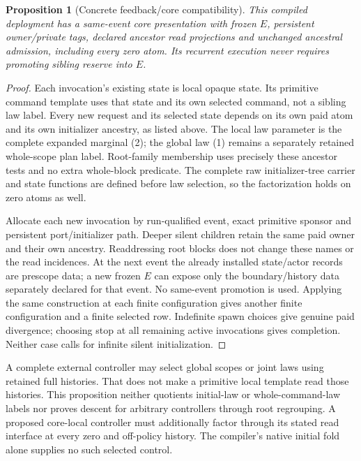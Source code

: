\documentclass[11pt]{article}
\newtheorem{proposition}{Proposition}
\begin{document}
\begin{proposition}[Concrete feedback/core compatibility]
This compiled deployment has a same-event core presentation with frozen $E$, persistent owner/private tags, declared ancestor read projections and unchanged ancestral admission, including every zero atom. Its recurrent execution never requires promoting sibling reserve into $E$.
\end{proposition}
\begin{proof}
Each invocation's existing state is local opaque state. Its primitive command template uses that state and its own selected command, not a sibling law label. Every new request and its selected state depends on its own paid atom and its own initializer ancestry, as listed above. The local law parameter is the complete expanded marginal (2); the global law (1) remains a separately retained whole-scope plan label. Root-family membership uses precisely these ancestor tests and no extra whole-block predicate. The complete raw initializer-tree carrier and state functions are defined before law selection, so the factorization holds on zero atoms as well.

Allocate each new invocation by run-qualified event, exact primitive sponsor and persistent port/initializer path. Deeper silent children retain the same paid owner and their own ancestry. Readdressing root blocks does not change these names or the read incidences. At the next event the already installed state/actor records are prescope data; a new frozen $E$ can expose only the boundary/history data separately declared for that event. No same-event promotion is used. Applying the same construction at each finite configuration gives another finite configuration and a finite selected row. Indefinite spawn choices give genuine paid divergence; choosing stop at all remaining active invocations gives completion. Neither case calls for infinite silent initialization.\end{proof}

A complete external controller may select global scopes or joint laws using retained full histories. That does not make a primitive local template read those histories. This proposition neither quotients initial-law or whole-command-law labels nor proves descent for arbitrary controllers through root regrouping. A proposed core-local controller must additionally factor through its stated read interface at every zero and off-policy history. The compiler's native initial fold alone supplies no such selected control.
\end{document}
